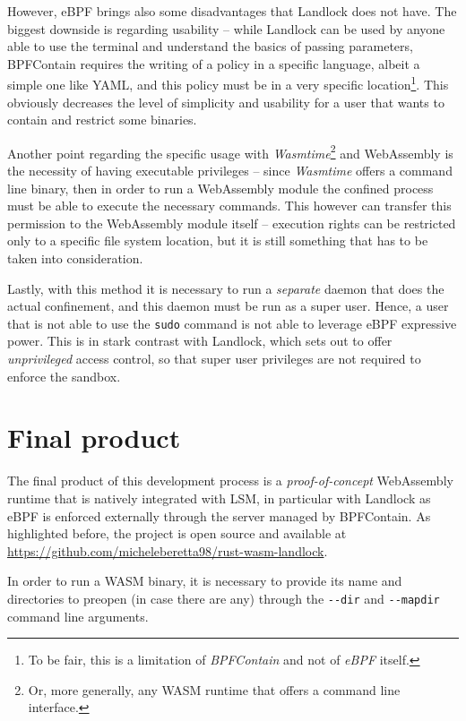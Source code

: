 However, eBPF brings also some disadvantages that Landlock does not have.
The biggest downside is regarding usability -- while Landlock can be used by anyone able to use
the terminal and understand the basics of passing parameters, BPFContain requires the writing
of a policy in a specific language, albeit a simple one like YAML, and this policy must be in a very
specific location\footnote{To be fair, this is a limitation of \textit{BPFContain} and not of \textit{eBPF} itself.}.
This obviously decreases the level of simplicity and usability for a user that wants to contain and restrict
some binaries.

Another point regarding the specific usage with \textit{Wasmtime}\footnote{Or, more generally, any
WASM runtime that offers a command line interface.} and WebAssembly is the necessity of
having executable privileges -- since \textit{Wasmtime} offers a command line binary, then in order to run
a WebAssembly module the confined process must be able to execute the necessary commands.
This however can transfer this permission to the WebAssembly module itself -- execution rights
can be restricted only to a specific file system
location, but it is still something that has to be taken into consideration.

Lastly, with this method it is necessary to run a \textit{separate} daemon that does the actual
confinement, and this daemon must be run as a super user.
Hence, a user that is not able to use the \texttt{sudo} command is not able to leverage eBPF
expressive power.
This is in stark contrast with Landlock, which sets out to offer \textit{unprivileged} access control,
so that super user privileges are not required to enforce the sandbox.

\section{Final product}

The final product of this development process is a \textit{proof-of-concept} WebAssembly runtime
that is natively integrated with LSM, in particular with Landlock as eBPF is enforced externally
through the server managed by BPFContain.
As highlighted before, the project is open source and available at \url{https://github.com/micheleberetta98/rust-wasm-landlock}.

In order to run a WASM binary, it is necessary to provide its name and directories to preopen (in case
there are any) through the \texttt{-{}-dir} and \texttt{-{}-mapdir} command line arguments.

